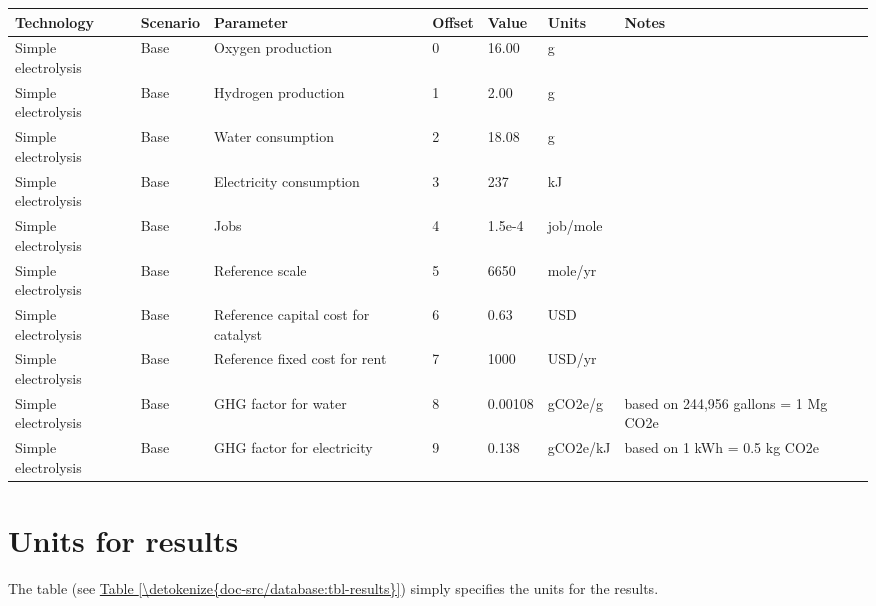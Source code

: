 \documentclass[letterpaper,10pt,english]{sphinxmanual}
\begin{document}
\begin{savenotes}\sphinxattablestart
\centering
{}
\sphinxthecaptionisattop
{}\label{\detokenize{doc-src/database:table-4}}\label{\detokenize{doc-src/database:tbl-parameters}}
\sphinxaftertopcaption
\begin{tabulary}{\linewidth}[t]{|T|T|T|T|T|T|T|}
\hline
\sphinxstyletheadfamily 
Technology
&\sphinxstyletheadfamily 
Scenario
&\sphinxstyletheadfamily 
Parameter
&\sphinxstyletheadfamily 
Offset
&\sphinxstyletheadfamily 
Value
&\sphinxstyletheadfamily 
Units
&\sphinxstyletheadfamily 
Notes
\\
\hline
Simple electrolysis
&
Base
&
Oxygen production
&
0
&
16.00
&
g
&\\
\hline
Simple electrolysis
&
Base
&
Hydrogen production
&
1
&
2.00
&
g
&\\
\hline
Simple electrolysis
&
Base
&
Water consumption
&
2
&
18.08
&
g
&\\
\hline
Simple electrolysis
&
Base
&
Electricity consumption
&
3
&
237
&
kJ
&\\
\hline
Simple electrolysis
&
Base
&
Jobs
&
4
&
1.5e-4
&
job/mole
&\\
\hline
Simple electrolysis
&
Base
&
Reference scale
&
5
&
6650
&
mole/yr
&\\
\hline
Simple electrolysis
&
Base
&
Reference capital cost for catalyst
&
6
&
0.63
&
USD
&\\
\hline
Simple electrolysis
&
Base
&
Reference fixed cost for rent
&
7
&
1000
&
USD/yr
&\\
\hline
Simple electrolysis
&
Base
&
GHG factor for water
&
8
&
0.00108
&
gCO2e/g
&
based on 244,956 gallons = 1 Mg CO2e
\\
\hline
Simple electrolysis
&
Base
&
GHG factor for electricity
&
9
&
0.138
&
gCO2e/kJ
&
based on 1 kWh = 0.5 kg CO2e
\\
\hline
\end{tabulary}
\par
\sphinxattableend\end{savenotes}


\section{Units for results}
\label{\detokenize{doc-src/database:units-for-results}}
The  table (see \hyperref[\detokenize{doc-src/database:tbl-results}]{Table \ref{\detokenize{doc-src/database:tbl-results}}}) simply specifies the units for
the results.
\end{document}
